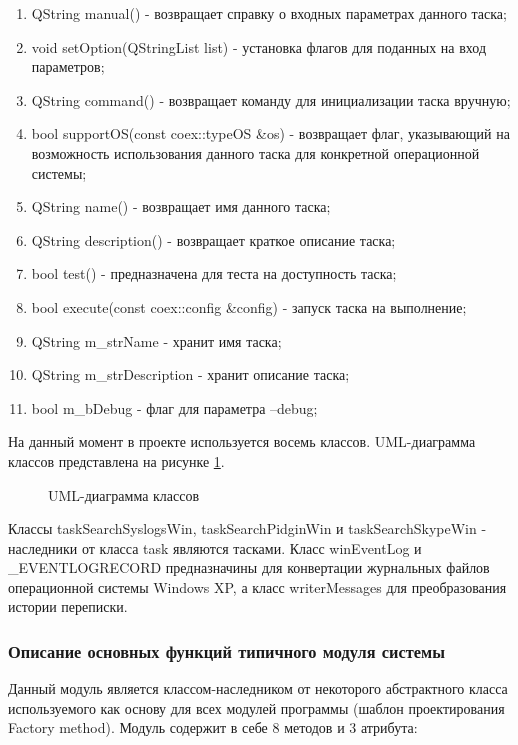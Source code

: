 \begin{enumerate}
\item QString manual() - возвращает справку о входных параметрах данного таска;
\item void setOption(QStringList list) - установка флагов для поданных на вход параметров;
\item QString command() - возвращает команду для инициализации таска вручную;
\item bool supportOS(const coex::typeOS \&os) - возвращает флаг, указывающий на возможность использования данного таска для конкретной операционной системы;
\item QString name() - возвращает имя данного таска;
\item QString description() - возвращает краткое описание таска;
\item bool test() - предназначена для теста на доступность таска;
\item bool execute(const coex::config \&config) - запуск таска на выполнение;
\item QString m\_strName - хранит имя таска;
\item QString m\_strDescription - хранит описание таска;
\item bool m\_bDebug - флаг для параметра --debug;
\end{enumerate}

На данный момент в проекте используется восемь классов. UML-диаграмма классов представлена на рисунке \ref{UML:UML}.

\begin{figure}[h!]
\caption{UML-диаграмма классов}
\label{UML:UML}
\end{figure}

Классы taskSearchSyslogsWin, taskSearchPidginWin и taskSearchSkypeWin - наследники от класса task являются тасками. Класс winEventLog и\\ \_EVENTLOGRECORD предназначины для конвертации журнальных файлов операционной системы Windows XP, а класс writerMessages для преобразования истории переписки.

\subsubsection{Описание основных функций типичного модуля системы}

Данный модуль является классом-наследником от некоторого абстрактного класса используемого как основу для всех модулей программы (шаблон проектирования Factory method). Модуль содержит в себе 8 методов и 3 атрибута:


